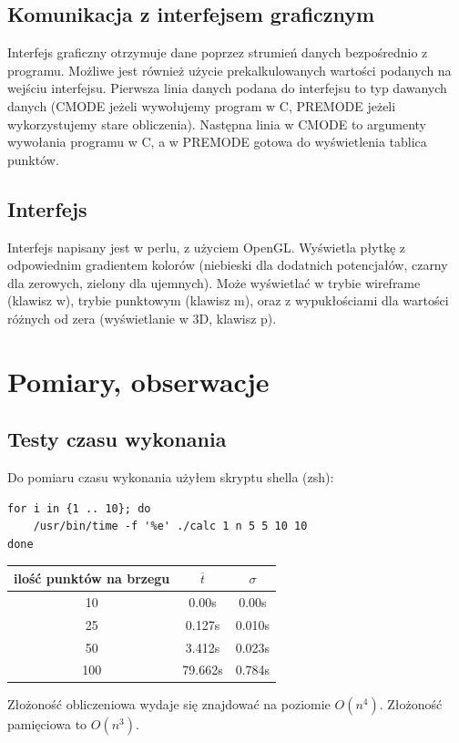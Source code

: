 \documentclass{article}
\begin{document}
\subsection{Komunikacja z interfejsem graficznym}
Interfejs graficzny otrzymuje dane poprzez strumień danych bezpośrednio z programu.
Możliwe jest również użycie prekalkulowanych wartości podanych na wejściu interfejsu.
Pierwsza linia danych podana do interfejsu to typ dawanych danych (CMODE jeżeli wywołujemy
program w C, PREMODE jeżeli wykorzystujemy stare obliczenia). Następna linia w CMODE to argumenty wywołania
programu w C, a w PREMODE gotowa do wyświetlenia tablica punktów.
\subsection{Interfejs}
Interfejs napisany jest w perlu, z użyciem OpenGL. Wyświetla płytkę z odpowiednim gradientem kolorów (niebieski
dla dodatnich potencjałów, czarny dla zerowych, zielony dla ujemnych). Może wyświetlać w trybie wireframe (klawisz w),
trybie punktowym (klawisz m), oraz z wypukłościami dla wartości różnych od zera (wyświetlanie w 3D, klawisz p).
\section{Pomiary, obserwacje}
\subsection{Testy czasu wykonania}
Do pomiaru czasu wykonania użyłem skryptu shella (zsh):
\begin{lstlisting}
for i in {1 .. 10}; do
	/usr/bin/time -f '%e' ./calc 1 n 5 5 10 10 
done
\end{lstlisting}
\begin{tabular}{|c|c|c|}
\hline
ilość punktów na brzegu & $\overline{t}$ & $\sigma$ \\
\hline
10 & 0.00s & 0.00s  \\
\hline
25 & 0.127s & 0.010s  \\
\hline
50 & 3.412s & 0.023s \\
\hline
100 & 79.662s & 0.784s \\
\hline
\end{tabular}
Złożoność obliczeniowa wydaje się znajdować na poziomie $O(n^4)$. Złożoność pamięciowa to $O(n^3)$.
\end{document}
